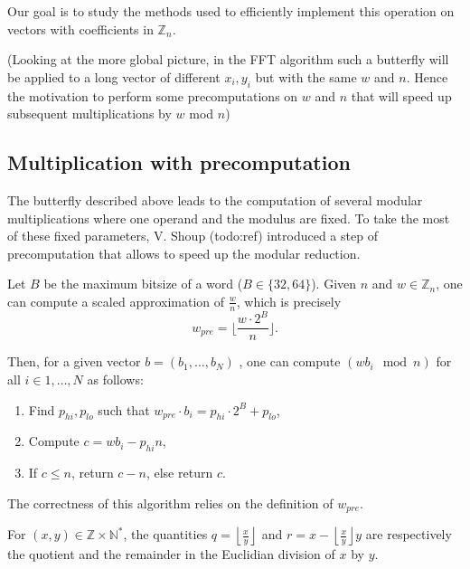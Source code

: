 \documentclass[a4paper]{article}
\begin{document}
Our goal is to study the methods used to efficiently implement this operation on vectors with coefficients in $\mathbb{Z}_n$.

(Looking at the more global picture, in the FFT algorithm such a butterfly will
be applied to a long vector of different \(x_i, y_i\) but with the same \(w\) and \(n\).
Hence the motivation to perform some precomputations on \(w\) and \(n\) that will speed
up subsequent multiplications by \(w\) mod \(n\))

\subsection{Multiplication with precomputation}

The butterfly described above leads to the computation of several modular multiplications where one operand and the modulus are fixed.
To take the most of these fixed parameters, V. Shoup (todo:ref) introduced a step of precomputation that allows to speed up the modular reduction.

Let $B$ be the maximum bitsize of a word ($B\in \{32, 64\}$). Given $n$ and $w \in \mathbb{Z}_n$, one can compute a scaled approximation 
of $\frac{w}{n}$, which is precisely $$ w_{pre} = \biggl\lfloor\dfrac{w\cdot 2^{B}}{n} \biggr\rfloor.$$

Then, for a given vector $b = (b_1,\dots, b_N)$ , one can compute $(wb_i \mod n)$ for all $i\in{1,\dots, N}$ as follows:

\begin{enumerate}
    \item Find $p_{hi}, p_{lo}$ such that $w_{pre} \cdot b_i = p_{hi}\cdot 2^B + p_{lo}$,
    \item Compute $c = wb_i - p_{hi}n$,
    \item If $c \leq n$, return $c-n$, else return $c$.
\end{enumerate}

The correctness of this algorithm relies on the definition of $w_{pre}$. 

\begin{proposition}\label{prop:quorem}
For $(x,y) \in \mathbb{Z}\times \mathbb{N}^*$, the quantities $q=\left\lfloor\frac{x}{y}\right\rfloor$ and 
$r=x - \left\lfloor\frac{x}{y}\right\rfloor y$ are respectively the quotient and the remainder in the Euclidian division of $x$ by $y$.
\end{proposition}
    
\end{document}
